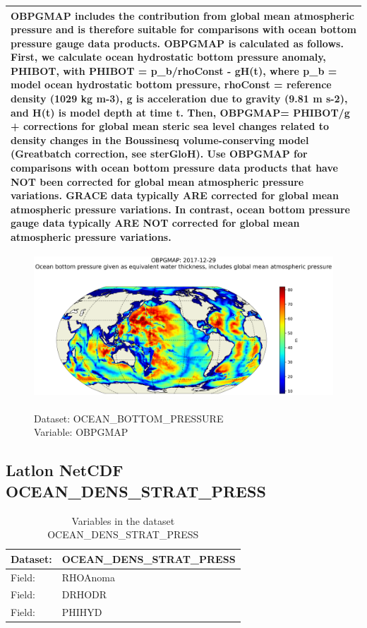 \begin{longtable}{|p{}|p{}|p{}|p{}|}
\multicolumn{4}{|p{1\textwidth}|}{OBPGMAP includes the contribution from global mean atmospheric pressure and is therefore suitable for comparisons with ocean bottom pressure gauge data products. OBPGMAP is calculated as follows. First, we calculate ocean hydrostatic bottom pressure anomaly, PHIBOT, with PHIBOT = p\_b/rhoConst - gH(t), where p\_b = model ocean hydrostatic bottom pressure, rhoConst = reference density (1029 kg m-3), g is acceleration due to gravity (9.81 m s-2), and H(t) is model depth at time t. Then, OBPGMAP= PHIBOT/g + corrections for global mean steric sea level changes related to density changes in the Boussinesq volume-conserving model (Greatbatch correction, see sterGloH). Use OBPGMAP for comparisons with ocean bottom pressure data products that have NOT been corrected for global mean atmospheric pressure variations. GRACE data typically ARE corrected for global mean atmospheric pressure variations. In contrast, ocean bottom pressure gauge data typically ARE NOT corrected for global mean atmospheric pressure variations.} \\ \hline
\end{longtable}

\begin{figure}[H]
\centering
\includegraphics[scale=0.5]{../images/plots/latlon_plots/Ocean_Bottom_Pressure/OBPGMAP.png}
\caption{\\Dataset: OCEAN\_BOTTOM\_PRESSURE\\Variable: OBPGMAP}
\label{tab:table-OCEAN_BOTTOM_PRESSURE_OBPGMAP-Plot}
\end{figure}
\pagebreak
\subsection{Latlon NetCDF OCEAN\_DENS\_STRAT\_PRESS}
\newp
\begin{longtable}{|p{}|p{}|}
\caption{Variables in the dataset OCEAN\_DENS\_STRAT\_PRESS}
\label{tab:table-OCEAN_DENS_STRAT_PRESS-fields} \\ 
\hline \endhead \hline \endfoot
\rowcolor{lightgray} \textbf{Dataset:} & \textbf{OCEAN\_DENS\_STRAT\_PRESS} \\ \hline
Field: &RHOAnoma \\ \hline
Field: &DRHODR \\ \hline
Field: &PHIHYD \\ \hline
\end{longtable}

